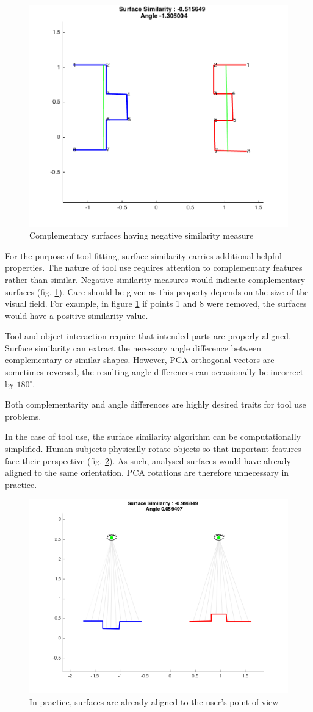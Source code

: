 \documentclass[
    floatsintext
]{article}
\begin{document}
\begin{figure}[!h]
  \centering
  \includegraphics[width=.6\textwidth]{./figures/complementary.png}
  \caption{Complementary surfaces having negative similarity measure}
  \label{fig:complementary}
\end{figure}  

For the purpose of tool fitting, surface similarity carries additional helpful properties. 
The nature of tool use requires attention to complementary features rather than similar. 
Negative similarity measures would indicate complementary surfaces (fig. \ref{fig:complementary}). 
Care should be given as this property depends on the size of the visual field.
For example, in figure \ref{fig:complementary} if points 1 and 8 were removed, the surfaces would have 
a positive similarity value. 

Tool and object interaction require that intended parts are properly aligned.
Surface similarity can extract the necessary angle difference between complementary or similar shapes.
However, PCA orthogonal vectors are sometimes reversed, the resulting angle differences can occasionally be incorrect by $180^{\circ}$. 

Both complementarity and angle differences are highly desired traits for tool use problems.

In the case of tool use, the surface similarity algorithm can be computationally simplified.
Human subjects physically rotate objects so that important features face their perspective (fig. \ref{fig:same_orientation}). 
As such, analysed surfaces would have already aligned to the same orientation.
PCA rotations are therefore unnecessary in practice. 

\begin{figure}[!h]
  \centering
  \includegraphics[width=.6\textwidth]{./figures/same_orientation.png}
  \caption{In practice, surfaces are already aligned to the user's point of view}
  \label{fig:same_orientation}
\end{figure}  
\end{document}
